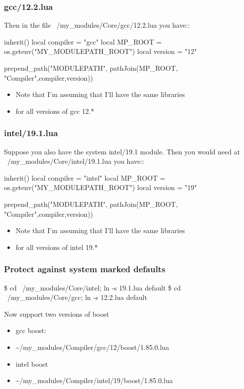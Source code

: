 \documentclass{beamer}
\begin{document}
\begin{frame}[fragile]
    \frametitle{gcc/12.2.lua}
 {\tiny
    \begin{semiverbatim}
Then in the file ~/my_modules/Core/gcc/12.2.lua you have::

   inherit()
   local compiler = "gcc"
   local MP\_ROOT  = os.getenv("MY\_MODULEPATH\_ROOT")
   local version  = "12"

   prepend_path("MODULEPATH", pathJoin(MP\_ROOT, "Compiler",compiler,version))
    \end{semiverbatim}
}
  \begin{itemize}
    \item Note that I'm assuming that I'll have the same libraries
    \item for all versions of gcc 12.*
  \end{itemize}
\end{frame}

\begin{frame}[fragile]
    \frametitle{intel/19.1.lua}
 {\tiny
    \begin{semiverbatim}
Suppose you also have the system intel/19.1  module.  Then you would
need at ~/my\_modules/Core/intel/19.1.lua you have::

   inherit()
   local compiler = "intel"
   local MP\_ROOT  = os.getenv("MY\_MODULEPATH\_ROOT")
   local version  = "19"

   prepend_path("MODULEPATH", pathJoin(MP\_ROOT, "Compiler",compiler,version))
    \end{semiverbatim}
}
  \begin{itemize}
    \item Note that I'm assuming that I'll have the same libraries
    \item for all versions of intel 19.*
  \end{itemize}
\end{frame}

\begin{frame}[fragile]
    \frametitle{Protect against system marked defaults}
 {\tiny
    \begin{semiverbatim}
    \$ cd ~/my\_modules/Core/intel; ln -s 19.1.lua default
    \$ cd ~/my\_modules/Core/gcc;   ln -s 12.2.lua default
    \end{semiverbatim}
}
\end{frame}

\begin{frame}{Now support two versions of boost}
  \begin{itemize}
    \item gcc boost:
    \item \textasciitilde{}/my\_modules/Compiler/gcc/12/boost/1.85.0.lua
    \item intel boost
    \item \textasciitilde{}/my\_modules/Compiler/intel/19/boost/1.85.0.lua
  \end{itemize}
\end{frame}
\end{document}
